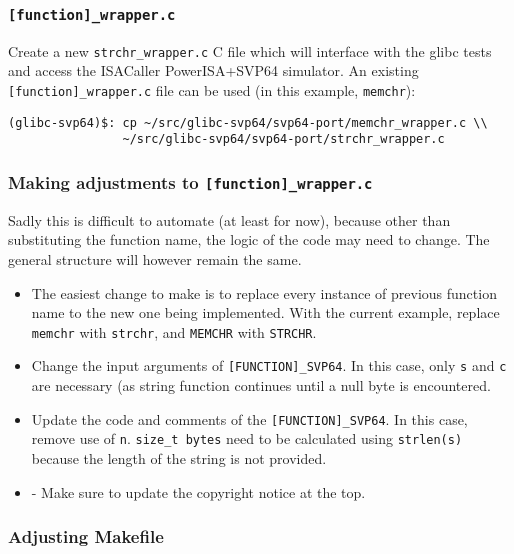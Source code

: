 \subsubsection{\texttt{[function]\_wrapper.c}}

Create a new \texttt{strchr\_wrapper.c} C file which will interface with
the glibc tests and access the ISACaller PowerISA+SVP64 simulator. An existing
\texttt{[function]\_wrapper.c} file can be used (in this example,
\texttt{memchr}):

\begin{verbatim}
(glibc-svp64)$: cp ~/src/glibc-svp64/svp64-port/memchr_wrapper.c \\
                ~/src/glibc-svp64/svp64-port/strchr_wrapper.c
\end{verbatim}

\subsubsection{Making adjustments to \texttt{[function]\_wrapper.c}}

Sadly this is difficult to automate (at least for now), because other than
substituting the function name, the logic of the code may need to change.
The general structure will however remain the same.

\begin{itemize}
  \item The easiest change to make is to replace every instance of previous
  function name to the new one being implemented. With the current example,
  replace \texttt{memchr} with \texttt{strchr},
  and \texttt{MEMCHR} with \texttt{STRCHR}.
  \item Change the input arguments of \texttt{[FUNCTION]\_SVP64}.
  In this case, only \texttt{s} and \texttt{c} are necessary
  (as string function continues until a null byte is encountered.
  \item Update the code and comments of the \texttt{[FUNCTION]\_SVP64}.
  In this case, remove use of \texttt{n}. \texttt{size\_t bytes} need to be
  calculated using \texttt{strlen(s)} because the length of the string
  is not provided.
  \item - Make sure to update the copyright notice at the top.
\end{itemize}

\subsubsection{Adjusting Makefile}

